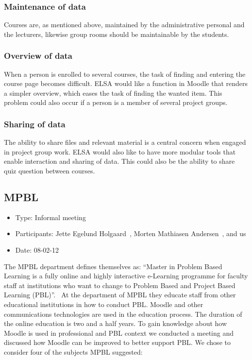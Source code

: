 \subsubsection{Maintenance of data} Courses are, as mentioned above, maintained by the administrative personal and the lecturers, likewise group rooms should be maintainable by the students.

\subsubsection{Overview of data} When a person is enrolled to several courses, the task of finding and entering the course page becomes difficult. 
ELSA would like a function in Moodle that renders a simpler overview, which eases the task of finding the wanted item.
This problem could also occur if a person is a member of several project groups.

\subsubsection{Sharing of data} The ability to share files and relevant material is a central concern when engaged in project group work. 
ELSA would also like to have more modular tools that enable interaction and sharing of data.
This could also be the ability to share quiz question between courses. 


\subsection{MPBL}
\label{sub:mpblInterview}
\begin{itemize}
	\item Type: Informal meeting
	\item Participants: Jette Egelund Holgaard~\cite{jette}, Morten Mathiasen Andersen~\cite{morten}, and us
	\item Date: 08-02-12
\end{itemize}
The MPBL department defines themselves as:
``Master in Problem Based Learning is a fully online and highly interactive e-Learning programme for faculty staff at institutions who want to change to Problem Based and Project Based Learning (PBL)''.~\cite{mpbl}
At the department of MPBL they educate staff from other educational institutions in how to conduct PBL.
Moodle and other communications technologies are used in the education process. 
The duration of the online education is two and a half years.
To gain knowledge about how Moodle is used in professional and PBL context we conducted a meeting and discussed how Moodle can be improved to better support PBL. 
We chose to consider four of the subjects MPBL suggested:

